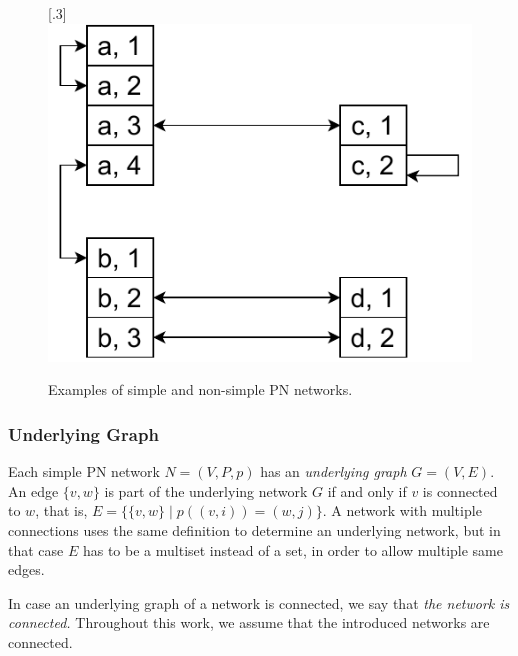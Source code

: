 \begin{figure}[H]
{    \label{fig:formal_pn2:c}
  }%
    [.3\linewidth] {
    \centering
    \includegraphics[scale=0.55]{diagrams/formalizing_pn_network_diagram3.pdf}
  }
  \caption{Examples of simple and non-simple PN networks.}
  \label{fig:formal_pn2}
\end{figure}


\subsubsection{Underlying Graph} \label{sec:underlying_graph}

Each simple PN network $N=(V,P,p)$ has an \emph{underlying graph} $G=(V,E)$.
An edge $\{v, w\}$ is part of the underlying network $G$ if and only if $v$ is connected to $w$, that is, $E = \{ \{v, w\} \mid  p((v, i)) = (w, j) \}$.
A network with multiple connections uses the same definition to determine an underlying network, but in that case $E$ has to be a multiset instead of a set, in order to allow multiple same edges.

In case an underlying graph of a network is connected, we say that \emph{the network is connected.}
Throughout this work, we assume that the introduced networks are connected.

